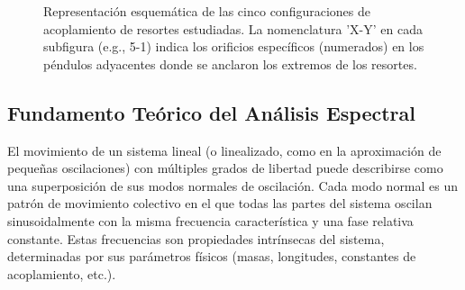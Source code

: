 \begin{figure}[htbp!]
  \hspace{0.1\textwidth}
  \caption{Representaci\'on esquem\'atica de las cinco configuraciones de
    acoplamiento de resortes estudiadas. La nomenclatura 'X-Y' en
    cada subfigura (e.g., 5-1) indica los orificios espec\'ificos
    (numerados) en los p\'endulos adyacentes donde se anclaron
  los extremos de los resortes.}
  \label{fig:configs}
\end{figure}

\subsection*{Fundamento Te\'orico del An\'alisis Espectral}

El movimiento de un sistema lineal (o linealizado, como en la
aproximaci\'on de peque\~nas oscilaciones) con m\'ultiples grados de
libertad puede describirse como una superposici\'on de sus
modos normales de oscilaci\'on. Cada modo normal es un patr\'on de
movimiento colectivo en el que todas las partes del sistema oscilan
sinusoidalmente con la misma frecuencia caracter\'istica y una fase
relativa constante. Estas frecuencias son propiedades intr\'insecas
del sistema, determinadas por sus par\'ametros f\'isicos (masas,
longitudes, constantes de acoplamiento, etc.).

